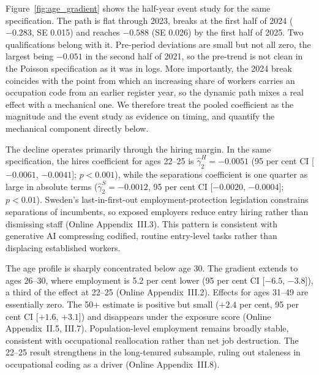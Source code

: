 \documentclass[preprint,12pt,authoryear]{elsarticle}
\begin{document}
Figure~\ref{fig:age_gradient} shows the half-year event study for the same specification. The path is flat through 2023, breaks at the first half of 2024 ($-0.283$, SE 0.015) and reaches $-0.588$ (SE 0.026) by the first half of 2025. Two qualifications belong with it. Pre-period deviations are small but not all zero, the largest being $-0.051$ in the second half of 2021, so the pre-trend is not clean in the Poisson specification as it was in logs. More importantly, the 2024 break coincides with the point from which an increasing share of workers carries an occupation code from an earlier register year, so the dynamic path mixes a real effect with a mechanical one.
We therefore treat the pooled coefficient as the magnitude and the event study as evidence on timing, and quantify the mechanical component directly below.

The decline operates primarily through the hiring margin. In the same specification, the hires coefficient for ages 22--25 is $\hat\gamma_2^H = -0.0051$ (95 per cent CI [$-0.0061$, $-0.0041$]; $p < 0.001$), while the separations coefficient is one quarter as large in absolute terms ($\hat\gamma_2^S = -0.0012$, 95 per cent CI [$-0.0020$, $-0.0004$]; $p < 0.01$). Sweden's last-in-first-out employment-protection legislation constrains separations of incumbents, so exposed employers reduce entry hiring rather than dismissing staff (Online Appendix~III.3). This pattern is consistent with generative AI compressing codified, routine entry-level tasks rather than displacing established workers.

The age profile is sharply concentrated below age 30. The gradient extends to ages 26--30, where employment is 5.2 per cent lower (95 per cent CI [$-6.5$, $-3.8$]), a third of the effect at 22--25 (Online Appendix~III.2). Effects for ages 31--49 are essentially zero. The 50+ estimate is positive but small ($+2.4$ per cent, 95 per cent CI [$+1.6$, $+3.1$]) and disappears under the \citet{eloundou2024gpts} exposure score (Online Appendix~II.5, III.7). Population-level employment remains broadly stable, consistent with occupational reallocation rather than net job destruction. The 22--25 result strengthens in the long-tenured subsample, ruling out staleness in occupational coding as a driver (Online Appendix~III.8).
\end{document}
